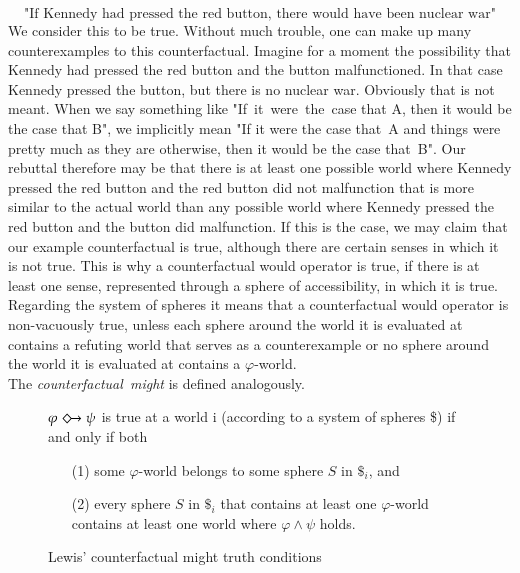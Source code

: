 \documentclass[a4paper,american]{paper}
\theoremstyle{definition}\newtheorem{definition}{Definition}
\begin{document}
\begin{equation}
\text{"If Kennedy had pressed the red button, there would have been nuclear war"}
\end{equation}
We consider this to be true. Without much trouble, one can make up many counterexamples to this counterfactual. Imagine for a moment the possibility that Kennedy had pressed the red button and the button malfunctioned. In that case Kennedy pressed the button, but there is no nuclear war. Obviously that is not meant. When we say something like "If~it~were~the~case that A, then it would be the case that B", we implicitly mean "If it were the case that~A and things were pretty much as they are otherwise, then it would be the case that~B". Our rebuttal therefore may be that there is at least one possible world where Kennedy pressed the red button and the red button did not malfunction that is more similar to the actual world than any possible world where Kennedy pressed the red button and the button did malfunction. If this is the case, we may claim that our example counterfactual is true, although there are certain senses in which it is not true. This is why a counterfactual would operator is true, if there is at least one sense, represented through a sphere of accessibility, in which it is true. Regarding the system of spheres it means that a counterfactual would operator is non-vacuously true, unless each sphere around the world it is evaluated at contains a refuting world that serves as a counterexample or no sphere around the world it is evaluated at contains a $\varphi$-world.\\
The \textit{counterfactual~might} is defined analogously.

\begin{figure}[H]
	\centering
	$\varphi\Diamondright\psi$ is true at a world i (according to a system of spheres \$) if and only if both
	\begin{itemize}
	\item[(1)] some $\varphi$-world belongs to some sphere $S$ in $\$_i$, and
	\item[(2)] every sphere $S$ in $\$_i$ that contains at least one $\varphi$-world contains at least one world where $\varphi\wedge\psi$ holds.
	\end{itemize}
	\caption{Lewis' counterfactual might truth conditions}
	\label{fig:counterfactual_might}
\end{figure}
\end{document}
